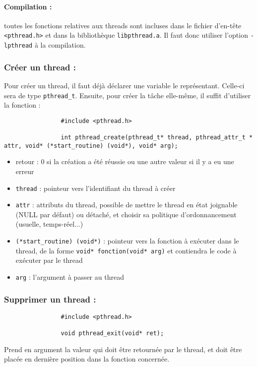 		\paragraph{Compilation :} toutes les fonctions relatives aux threads sont incluses dans le fichier d'en-tête \lstinline!<pthread.h>! et dans la bibliothèque \lstinline!libpthread.a!. Il faut donc utiliser l'option \lstinline!-lpthread! à la compilation.

		
		\subsubsection*{Créer un thread :}
			Pour créer un thread, il faut déjà déclarer une variable le représentant. Celle-ci sera de type \lstinline!pthread_t!. Ensuite, pour créer la tâche elle-même, il suffit d'utiliser la fonction :
			\begin{lstlisting}
				#include <pthread.h>

				int pthread_create(pthread_t* thread, pthread_attr_t * attr, void* (*start_routine) (void*), void* arg);
			\end{lstlisting}

			\begin{itemize}
				\item retour : 0 si la création a été réussie ou une autre valeur si il y a eu une erreur
				\item \lstinline!thread! : pointeur vers l'identifiant du thread à créer
				\item \lstinline!attr! : attributs du thread, possible de mettre le thread en état joignable (NULL par défaut) ou détaché, et choisir sa politique d'ordonnancement (usuelle, temps-réel...)
				\item \lstinline!(*start_routine) (void*)! : pointeur vers la fonction à exécuter dans le thread, de la forme \lstinline!void* fonction(void* arg)! et contiendra le code à exécuter par le thread
				\item \lstinline!arg! : l'argument à passer au thread
			\end{itemize}
			
		\subsubsection*{Supprimer un thread :}
			\begin{lstlisting}
				#include <pthread.h>

				void pthread_exit(void* ret);
			\end{lstlisting}
			Prend en argument la valeur qui doit être retournée par le thread, et doit être placée en dernière position dans la fonction concernée.\\
			

